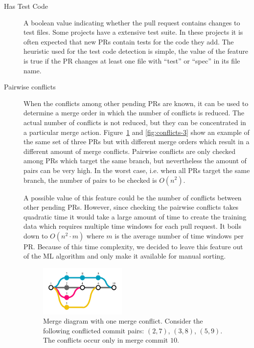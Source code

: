 \begin{description}
\item[Has Test Code]
A boolean value indicating whether the pull request contains changes to test files.
Some projects have a extensive test suite.
In these projects it is often expected that new PRs contain tests for the code they add.
The heuristic used for the test code detection is simple, the value of the feature is true if the PR changes at least one file with ``test'' or ``spec'' in its file name.

\item[Pairwise conflicts]
When the conflicts among other pending PRs are known, it can be used to determine a merge order in which the number of conflicts is reduced.
The actual number of conflicts is not reduced, but they can be concentrated in a particular merge action.
Figure~\ref{fig:conflicts-1} and \ref{fig:conflicts-3} show an example of the same set of three PRs but with different merge orders which result in a different amount of merge conflicts.
Pairwise conflicts are only checked among PRs which target the same branch, but nevertheless the amount of pairs can be very high.
In the worst case, i.e. when all PRs target the same branch, the number of pairs to be checked is $O(n^2)$.

A possible value of this feature could be the number of conflicts between other pending PRs.
However, since checking the pairwise conflicts takes quadratic time it would take a large amount of time to create the training data which requires multiple time windows for each pull request.
It boils down to $O(n^2 \cdot m)$ where $m$ is the average number of time windows per PR.
Because of this time complexity, we decided to leave this feature out of the ML algorithm and only make it available for manual sorting.

\begin{figure}
  \centering
  \includegraphics[height=25mm, clip ,trim = 0mm 7mm 0mm 7mm]{../figs/conflicts-1.pdf}
  \caption[Merge diagram with one conflict]
   {Merge diagram with one merge conflict.
   Consider the following conflicted commit pairs: $(2,7)$, $(3,8)$, $(5,9)$.
   The conflicts occur only in merge commit $10$.}
  \label{fig:conflicts-1}
\end{figure}


\end{description}
